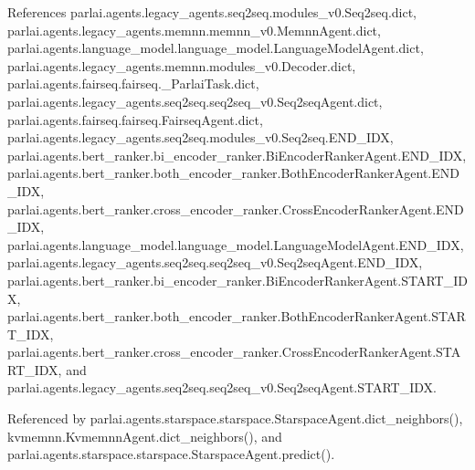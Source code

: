 References parlai.\+agents.\+legacy\+\_\+agents.\+seq2seq.\+modules\+\_\+v0.\+Seq2seq.\+dict, parlai.\+agents.\+legacy\+\_\+agents.\+memnn.\+memnn\+\_\+v0.\+Memnn\+Agent.\+dict, parlai.\+agents.\+language\+\_\+model.\+language\+\_\+model.\+Language\+Model\+Agent.\+dict, parlai.\+agents.\+legacy\+\_\+agents.\+memnn.\+modules\+\_\+v0.\+Decoder.\+dict, parlai.\+agents.\+fairseq.\+fairseq.\+\_\+\+Parlai\+Task.\+dict, parlai.\+agents.\+legacy\+\_\+agents.\+seq2seq.\+seq2seq\+\_\+v0.\+Seq2seq\+Agent.\+dict, parlai.\+agents.\+fairseq.\+fairseq.\+Fairseq\+Agent.\+dict, parlai.\+agents.\+legacy\+\_\+agents.\+seq2seq.\+modules\+\_\+v0.\+Seq2seq.\+E\+N\+D\+\_\+\+I\+DX, parlai.\+agents.\+bert\+\_\+ranker.\+bi\+\_\+encoder\+\_\+ranker.\+Bi\+Encoder\+Ranker\+Agent.\+E\+N\+D\+\_\+\+I\+DX, parlai.\+agents.\+bert\+\_\+ranker.\+both\+\_\+encoder\+\_\+ranker.\+Both\+Encoder\+Ranker\+Agent.\+E\+N\+D\+\_\+\+I\+DX, parlai.\+agents.\+bert\+\_\+ranker.\+cross\+\_\+encoder\+\_\+ranker.\+Cross\+Encoder\+Ranker\+Agent.\+E\+N\+D\+\_\+\+I\+DX, parlai.\+agents.\+language\+\_\+model.\+language\+\_\+model.\+Language\+Model\+Agent.\+E\+N\+D\+\_\+\+I\+DX, parlai.\+agents.\+legacy\+\_\+agents.\+seq2seq.\+seq2seq\+\_\+v0.\+Seq2seq\+Agent.\+E\+N\+D\+\_\+\+I\+DX, parlai.\+agents.\+bert\+\_\+ranker.\+bi\+\_\+encoder\+\_\+ranker.\+Bi\+Encoder\+Ranker\+Agent.\+S\+T\+A\+R\+T\+\_\+\+I\+DX, parlai.\+agents.\+bert\+\_\+ranker.\+both\+\_\+encoder\+\_\+ranker.\+Both\+Encoder\+Ranker\+Agent.\+S\+T\+A\+R\+T\+\_\+\+I\+DX, parlai.\+agents.\+bert\+\_\+ranker.\+cross\+\_\+encoder\+\_\+ranker.\+Cross\+Encoder\+Ranker\+Agent.\+S\+T\+A\+R\+T\+\_\+\+I\+DX, and parlai.\+agents.\+legacy\+\_\+agents.\+seq2seq.\+seq2seq\+\_\+v0.\+Seq2seq\+Agent.\+S\+T\+A\+R\+T\+\_\+\+I\+DX.



Referenced by parlai.\+agents.\+starspace.\+starspace.\+Starspace\+Agent.\+dict\+\_\+neighbors(), kvmemnn.\+Kvmemnn\+Agent.\+dict\+\_\+neighbors(), and parlai.\+agents.\+starspace.\+starspace.\+Starspace\+Agent.\+predict().

